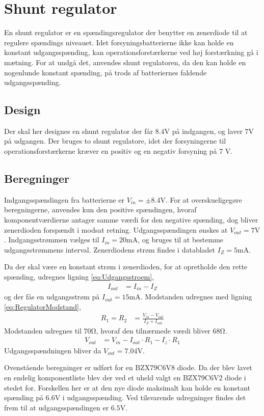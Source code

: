 \section{Shunt regulator}\label{sec:shunt}
En shunt regulator er en spændingsregulator der benytter en zenerdiode til at regulere spændings niveauet.
Idet forsyningsbatterierne ikke kan holde en konstant udgangsspænding, kan operationsforstærkerne ved høj forstærkning gå i mætning. 
For at undgå det, anvendes shunt regulatoren, da den kan holde en nogenlunde konstant spænding, på trods af batteriernes faldende udgangsspænding.

\subsection{Design}
Der skal her designes en shunt regulator der får $8.4 \si{\volt}$ på indgangen, og laver $7\si{\volt}$ på udgangen.
Der bruges to shunt regulatore, idet der forsyningerne til operationsforstærkerne kræver en positiv og en negativ forsyning på 7 \si{\volt}.

\subsection{Beregninger}
Indgangsspændingen fra batterierne er $V_{in} = \pm 8.4 \si{\volt}$. 
For at overskueligegøre beregningerne, anvendes kun den positive spændingen, hvoraf komponentværdierne antager samme værdi for den negative spænding, dog bliver zenerdioden forspændt i modsat retning.
Udgangsspændingen ønskes at $V_{out} = 7 \si{\volt}$. 
Indgangsstrømmen vælges til $I_{in} = 20\si{\milli\ampere}$, og bruges til at bestemme udgangsstrømmens interval.
Zenerdiodens strøm findes i databladet $I_Z = 5 \si{\milli\ampere}$.

Da der skal være en konstant strøm i zenerdioden, for at opretholde den rette spænding, udregnes ligning \ref{eq:Udgangsstroem},
\begin{align}
	I_{out} & = I_{in} - I_Z \label{eq:Udgangsstroem}
\end{align}
og der fås en udgangsstrøm på $I_{out} = 15 \si{\milli\ampere}$.
Modstanden udregnes med ligning \ref{eq:RegulatorModstand}, 
\begin{align}
	R_1 = R_2 & = \frac{V_{in} - V_{out}}{I_Z + I_{out}} \label{eq:RegulatorModstand}
\end{align}
Modstanden udregnes til $70 \si{\ohm}$, hvoraf den tilnærmede værdi bliver $68 \si{\ohm}$.
\begin{align}
	V_{out} & = V_{in} - I_{out} \cdot R_1 - I_z \cdot R_1
\end{align}
Udgangsspændningen bliver da $V_{out} = 7.04 \si{\volt}$.

Ovenstående beregninger er udført for en BZX79C6V8 diode. 
Da der blev lavet en endelig komponentliste blev der ved et uheld valgt en BZX79C6V2 diode i stedet for. 
Forskellen her er at den nye diode maksimalt kan holde en konstant spænding på $6.6 \si{\volt}$ i udgangsspænding.
Ved tilsvarende udregninger findes det frem til at udgangsspændingen er $6.5 \si{\volt}$.
